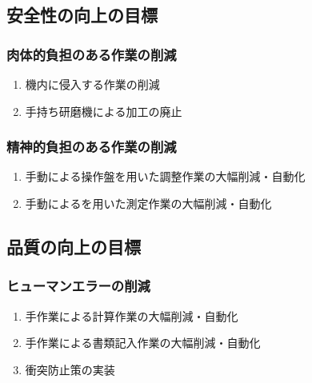 \clearpage
\subsection{安全性の向上の目標}

\subsubsection{肉体的負担のある作業の削減}
\begin{enumerate}[label=\sarrow]
\item 機内に侵入する作業の削減
\item 手持ち研磨機による加工の廃止
\end{enumerate}

\subsubsection{精神的負担のある作業の削減}
\begin{enumerate}[label=\sarrow]
\item 手動による操作盤を用いた調整作業の大幅削減・自動化
\item 手動による\TouchSensorProbe を用いた測定作業の大幅削減・自動化
\end{enumerate}


\subsection{品質の向上の目標}

\subsubsection{ヒューマンエラーの削減}
\begin{enumerate}[label=\sarrow]
\item 手作業による計算作業の大幅削減・自動化
\item 手作業による書類記入作業の大幅削減・自動化
\item 衝突防止策の実装
\end{enumerate}

